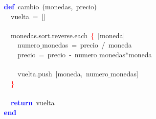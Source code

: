 \noindent
\mbox{}\textbf{\textcolor{Blue}{def}}\ cambio\ \textcolor{BrickRed}{(}monedas\textcolor{BrickRed}{,}\ precio\textcolor{BrickRed}{)} \\
\mbox{}\ \ vuelta\ \textcolor{BrickRed}{=}\ \textcolor{BrickRed}{[]} \\
\mbox{} \\
\mbox{}\ \ monedas\textcolor{BrickRed}{.}sort\textcolor{BrickRed}{.}reverse\textcolor{BrickRed}{.}each\ \textcolor{Red}{\{}\ \textcolor{BrickRed}{$|$}moneda\textcolor{BrickRed}{$|$} \\
\mbox{}\ \ \ \ numero$\_$monedas\ \textcolor{BrickRed}{=}\ precio\ \textcolor{BrickRed}{/}\ moneda \\
\mbox{}\ \ \ \ precio\ \textcolor{BrickRed}{=}\ precio\ \textcolor{BrickRed}{-}\ numero$\_$monedas\textcolor{BrickRed}{*}moneda \\
\mbox{} \\
\mbox{}\ \ \ \ vuelta\textcolor{BrickRed}{.}push\ \textcolor{BrickRed}{[}moneda\textcolor{BrickRed}{,}\ numero$\_$monedas\textcolor{BrickRed}{]} \\
\mbox{}\ \ \textcolor{Red}{\}} \\
\mbox{} \\
\mbox{}\ \ \textbf{\textcolor{Blue}{return}}\ vuelta \\
\mbox{}\textbf{\textcolor{Blue}{end}} \\
\mbox{}
